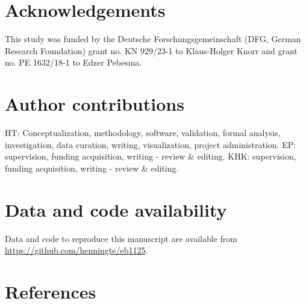 \documentclass[
  12pt,
]{article}
\begin{document}
\hypertarget{acknowledgements}{%
\section*{Acknowledgements}\label{acknowledgements}}

This study was funded by the Deutsche Forschungsgemeinschaft (DFG, German Research Foundation) grant no. KN 929/23-1 to Klaus-Holger Knorr and grant no. PE 1632/18-1 to Edzer Pebesma.

\hypertarget{author-contributions}{%
\section*{Author contributions}\label{author-contributions}}

HT: Conceptualization, methodology, software, validation, formal analysis, investigation, data curation, writing, visualization, project administration. EP: supervision, funding acquisition, writing - review \& editing. KHK: supervision, funding acquisition, writing - review \& editing.

\hypertarget{data-and-code-availability}{%
\section*{Data and code availability}\label{data-and-code-availability}}

Data and code to reproduce this manuscript are available from \url{https://github.com/henningte/eb1125}.

\hypertarget{references}{%
\section*{References}\label{references}}
\end{document}
